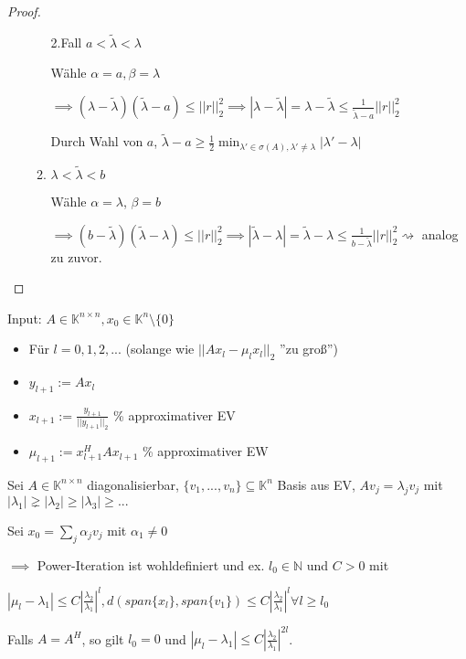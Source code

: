 \begin{proof}
\begin{enumerate}
\begin{enumerate}
			2.Fall $a < \tilde{\lambda} < \lambda$
			
			Wähle $\alpha = a, \beta = \lambda$
			
			$\implies (\lambda - \tilde{\lambda}) (\tilde{\lambda} - a) \leq ||r||_2^2 \implies |\lambda - \tilde{\lambda}| = \lambda - \tilde{\lambda} \leq \frac{1}{\tilde{\lambda} - a}||r||_2^2$
			
			Durch Wahl von $a$, $\tilde{\lambda} - a \geq \frac{1}{2} \min_{\lambda' \in \sigma(A), \lambda' \neq \lambda} |\lambda' - \lambda|$
			
			\item $\lambda < \tilde{\lambda} < b$
			
			Wähle $\alpha = \lambda$, $\beta = b$
			
			$\implies (b-\tilde{\lambda})(\tilde{\lambda} - \lambda) \leq ||r||_2^2 \implies |\tilde{\lambda} - \lambda| = \tilde{\lambda} - \lambda \leq \frac{1}{b-\tilde{\lambda}} ||r||_2^2 \rightsquigarrow$ analog zu zuvor.
		\end{enumerate}
	\end{enumerate}
\end{proof}

\begin{algorithm}
	Input: $A \in \mathbb{K}^{n\times n}, x_0 \in \mathbb{K}^n\setminus\{0\}$
	\begin{itemize}
		\item Für $l=0,1,2,...$ (solange wie $||Ax_l - \mu_lx_l||_2$ ''zu groß'')
		\item \hspace{0.5cm} $y_{l+1} := Ax_l$
		\item \hspace{0.5cm} $x_{l+1} := \frac{y_{l+1}}{||y_{l+1}||_2}$ \% approximativer EV
		\item \hspace{0.5cm} $\mu_{l+1} := x_{l+1}^HAx_{l+1}$ \% approximativer EW
	\end{itemize}
\end{algorithm}

\begin{theorem}
	Sei $A \in \mathbb{K}^{n\times n}$ diagonalisierbar, $\{v_1, ..., v_n\} \subseteq \mathbb{K}^n$ Basis aus EV, $Av_j = \lambda_j v_j$ mit $|\lambda_1| \gneq |\lambda_2| \geq |\lambda_3| \geq ...$
	
	Sei $x_0 = \sum_{j} \alpha_j v_j$ mit $\alpha_1 \neq 0$
	
	$\implies$ Power-Iteration ist wohldefiniert und ex. $l_0 \in \mathbb{N}$ und $C > 0$ mit
	
	$|\mu_l - \lambda_1| \leq C \left|\frac{\lambda_2}{\lambda_1}\right|^l, d(span\{x_l\}, span\{v_1\}) \leq C \left|\frac{\lambda_2}{\lambda_1}\right|^l \forall l \geq l_0$
		
	Falls $A=A^H$, so gilt $l_0 = 0$ und $|\mu_l - \lambda_1| \leq C \left|\frac{\lambda_2}{\lambda_1}\right|^{2l}$.
\end{theorem}

